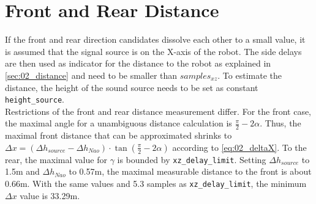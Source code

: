 \section{Front and Rear Distance}
\label{sec:03_distance}

If the front and rear direction candidates dissolve each other to a small
value, it is assumed that the signal source is on the X-axis of the robot.
The side delays are then used as indicator for the distance to the robot as
explained in \cref{sec:02_distance} and need to be smaller than
 $samples_{xz}$.
To estimate the distance, the height of the sound source needs to be set as
constant  \lstinline!height_source!.\\
Restrictions of the front and rear distance measurement differ.
For the front case, the maximal angle for a unambiguous distance calculation
is $\frac{\pi}{2}- 2\alpha$.
Thus, the maximal front distance that can be approximated shrinks to
$\Delta x = (\Delta h_{source} - \Delta h_{Nao}) \cdot \tan(\frac{\pi}{2} - 2\alpha)$
according to \cref{eq:02_deltaX}.
To the rear, the maximal value for $\gamma$ is bounded by 
\lstinline!xz_delay_limit!.
Setting $\Delta h_{source}$ to 1.5\si{m} and $\Delta h_{Nao}$ to 0.57\si{m},
the maximal measurable distance to the front is about 0.66\si{m}.
With the same values and 5.3 samples as \lstinline!xz_delay_limit!, the
minimum $\Delta x$ value is 33.29\si{m}.
